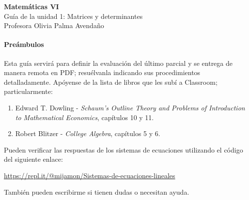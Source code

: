 \documentclass[8pt,a4paper]{article}
\begin{document}
	\begin{center}
				\textbf{Matemáticas VI}\\
				Guía de la unidad 1: Matrices y determinantes \\
				Profesora Olivia Palma Avendaño
				\bigskip
	\end{center}
	
\paragraph*{Preámbulos} Esta guía servirá para definir la evaluación del último parcial y se entrega de manera remota en PDF; resuélvanla indicando sus procedimientos detalladamente. Apóyense de la lista de libros que les subí a Classroom; particularmente:

	\begin{enumerate}
		\item Edward T. Dowling - \textit{Schaum's Outline Theory and Problems of Introduction to Mathematical Economics}, capítulos 10 y 11.
		\item Robert Blitzer - \textit{College Algebra}, capítulos 5 y 6.
	\end{enumerate}

Pueden verificar las respuestas de los sistemas de ecuaciones utilizando el código del siguiente enlace:
	
	\begin{center}
		\url{https://repl.it/@mijamon/Sistemas-de-ecuaciones-lineales}
	\end{center}

También pueden escribirme si tienen dudas o necesitan ayuda.
\end{document}
